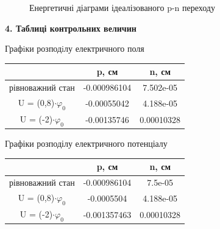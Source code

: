 \documentclass[14pt,a4paper]{scrartcl}
\begin{document}
\begin{center}
\begin{figure}[h]
\caption{Енергетичні діаграми ідеалізованого p-n переходу}
\label{ris:image5}
\end{figure}
\end{center}


\clearpage
\newpage
\begin{center}\textbf{4. Таблиці контрольних величин}\\ \end{center}


Графiки розподiлу електричного поля\\

\begin{tabular}{ | c | c | c | }
\hline
& p, см & n, см  \\ \hline
рівноважний стан & -0.000986104 & 7.502e-05 \\
U = (0,8)$\cdot\varphi_0$ & -0.00055042 & 4.188e-05 \\
U = (-2)$\cdot\varphi_0$ & -0.00135746 & 0.00010328 \\
\hline
\end{tabular}

Графіки розподілу електричного потенціалу\\

\begin{tabular}{ | c | c | c | }
\hline
& p, см & n, см  \\ \hline
рівноважний стан & -0.000986104 & 7.5e-05 \\
U = (0,8)$\cdot\varphi_0$ & -0.0005504 & 4.188e-05 \\
U = (-2)$\cdot\varphi_0$ & -0.001357463 & 0.00010328 \\
\hline
\end{tabular}
\end{document}
